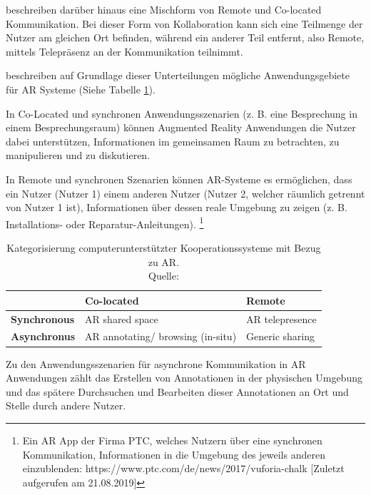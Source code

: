 \citeauthor{Marriott2018} beschreiben darüber hinaus eine Mischform von Remote und Co-located Kommunikation. 
Bei dieser Form von Kollaboration kann sich eine Teilmenge der Nutzer am gleichen Ort befinden, während ein anderer Teil entfernt, 
also Remote, mittels Telepräsenz an der Kommunikation teilnimmt.\cite[S.~188]{Marriott2018}

\citeauthor{DieterSchmalstieg2016} beschreiben auf Grundlage dieser Unterteilungen mögliche 
Anwendungsgebiete für AR Systeme (Siehe Tabelle \ref{tab:categorycscw}).\cite[S.~362]{DieterSchmalstieg2016}

In Co-Located und synchronen Anwendungsszenarien (z. B. eine Besprechung in einem Besprechungsraum) können 
Augmented Reality Anwendungen die Nutzer dabei unterstützen, Informationen im gemeinsamen Raum zu betrachten, zu manipulieren und zu diskutieren.\cite[S.~362]{DieterSchmalstieg2016}  

In Remote und synchronen Szenarien können AR-Systeme es ermöglichen, dass ein Nutzer (Nutzer 1) einem anderen Nutzer (Nutzer 2, welcher räumlich getrennt von Nutzer 1 ist), 
Informationen über dessen reale Umgebung zu zeigen (z. B. Installations- oder Reparatur-Anleitungen). \footnote{Ein AR App der Firma PTC, welches Nutzern über eine synchronen Kommunikation, Informationen in die Umgebung des jeweils anderen einzublenden: https://www.ptc.com/de/news/2017/vuforia-chalk [Zuletzt aufgerufen am 21.08.2019]} 

\begin{table}[htbp]
\caption{Kategorisierung computerunterstützter Kooperationssysteme mit Bezug zu AR. \\Quelle: \cite[S.~362]{DieterSchmalstieg2016}}
	\begin{center}
		\begin{tabular}{|l|ll|}
		\hline
		 & \textbf{Co-located} & \textbf{Remote}\\
		\hline
		\textbf{Synchronous} &  AR shared space & AR telepresence \\
		\textbf{Asynchronus} & AR annotating/ browsing (in-situ) & Generic sharing\\
		\hline
		\end{tabular}
	\end{center}
	\label{tab:categorycscw}
\end{table}

Zu den Anwendungsszenarien für asynchrone Kommunikation in AR Anwendungen zählt das Erstellen von Annotationen in der 
physischen Umgebung und das spätere Durchsuchen und Bearbeiten dieser Annotationen an Ort und Stelle durch andere Nutzer. \cite[S.~362]{DieterSchmalstieg2016}		

